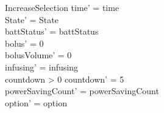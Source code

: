\begin{schema}{IncreaseSelection}
	time' = time\\ State' = State\\
	battStatus' = battStatus\\
	bolus' = 0\\
	bolusVolume' = 0\\
	infusing' = infusing\\
	countdown > 0 \land countdown' = 5\\
	powerSavingCount' = powerSavingCount\\ option' = option\\
\end{schema}

